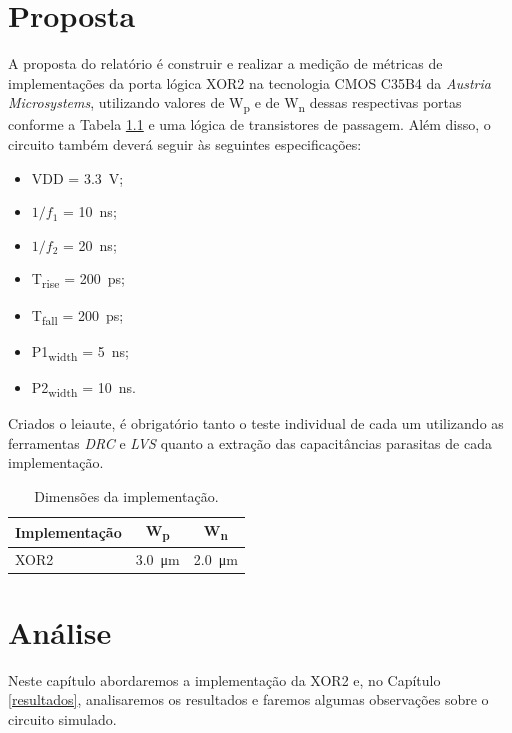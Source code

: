 \documentclass{iiufrgs}
\begin{document}
\chapter{Proposta}\label{proposta}
A proposta do relatório é construir e realizar a medição de métricas de implementações da porta lógica XOR2 na tecnologia CMOS C35B4 da \textit{Austria Microsystems}, utilizando valores de W\textsubscript{p} e de W\textsubscript{n} dessas respectivas portas conforme a Tabela \ref{tab:imp} e uma lógica de transistores de passagem.
Além disso, o circuito também deverá seguir às seguintes especificações:

\begin{itemize}[noitemsep]
    \setlength{\itemindent}{1em}
    \item VDD = \SI{3.3}{\V};
    \item $1/{f_1}$ = \SI{10}{\ns};
    \item $1/{f_2}$ = \SI{20}{\ns};
    \item T\textsubscript{rise} = \SI{200}{\ps};
    \item T\textsubscript{fall} = \SI{200}{\ps};
    \item P1\textsubscript{width} = \SI{5}{\ns};
    \item P2\textsubscript{width} = \SI{10}{\ns}.
\end{itemize}

Criados o leiaute, é obrigatório tanto o teste individual de cada um utilizando as ferramentas \textit{DRC} e \textit{LVS} quanto a extração das capacitâncias parasitas de cada implementação.

\begin{table}[ht]
    \centering
    \caption{Dimensões da implementação.}
    \label{tab:imp}
    \begin{tabular}{l c c}
        \hline
        Implementação
        & W\textsubscript{p}
        & W\textsubscript{n} \\ \hline
        XOR2 & \SI{3.0}{\um}    & \SI{2.0}{\um}     \\ \hline
    \end{tabular}
\end{table}

\chapter{Análise}\label{analise}
Neste capítulo abordaremos a implementação da XOR2 e, no Capítulo \ref{resultados}, analisaremos os resultados e faremos algumas observações sobre o circuito simulado.
\end{document}
